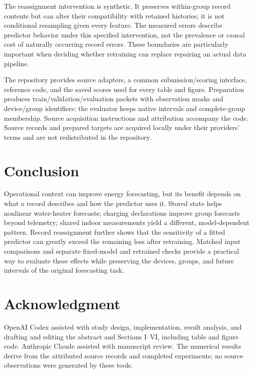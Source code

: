 \documentclass[conference,a4paper]{IEEEtran}
\begin{document}
The reassignment intervention is synthetic. It preserves within-group
record contents but can alter their compatibility with retained histories;
it is not conditional resampling given every feature. The measured errors
describe predictor behavior under this specified intervention, not the
prevalence or causal cost of naturally occurring record errors. These
boundaries are particularly important when deciding whether retraining
can replace repairing an actual data pipeline.

The repository provides source adapters, a common submission/scoring
interface, reference code, and the saved scores used for every table and
figure. Preparation produces train/validation/evaluation packets with
observation masks and device/group identifiers; the evaluator keeps native
intervals and complete-group membership. Source acquisition instructions
and attribution accompany the code. Source records and prepared targets
are acquired locally under their providers' terms and are not redistributed
in the repository.

\balance
\section{Conclusion}
Operational context can improve energy forecasting, but its benefit depends
on what a record describes and how the predictor uses it. Stored state
helps nonlinear water-heater forecasts; charging declarations improve
group forecasts beyond telemetry; shared indoor measurements yield a
different, model-dependent pattern. Record reassignment further shows that
the sensitivity of a fitted predictor can greatly exceed the remaining
loss after retraining. Matched input comparisons and separate fixed-model
and retrained checks provide a practical way to evaluate these effects
while preserving the devices, groups, and future intervals of the
original forecasting task.

\section*{Acknowledgment}
OpenAI Codex assisted with study design, implementation, result analysis,
and drafting and editing the abstract and Sections I--VI, including table
and figure code. Anthropic Claude assisted with manuscript review.
The numerical results derive from the attributed source records and
completed experiments; no source observations were generated by these tools.



\end{document}
